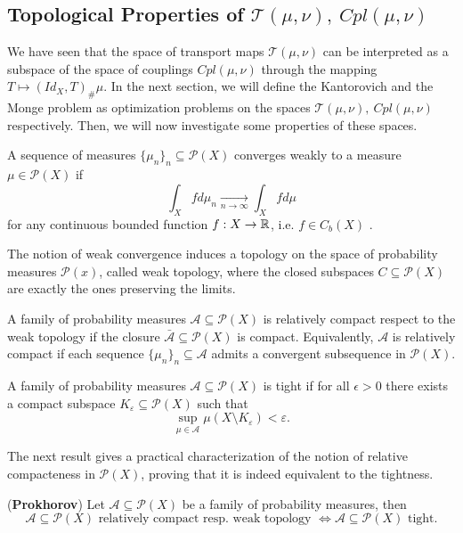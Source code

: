 \documentclass[../main.tex]{subfiles}
\begin{document}
\subsection{Topological Properties of $\mathcal{T}(\mu, \nu), \ Cpl(\mu, \nu)$}
We have seen that the space of transport maps $\mathcal{T}(\mu, \nu)$ can be interpreted as a subspace of the space of couplings $Cpl(\mu, \nu)$ through the mapping $T\mapsto (Id_X, T)_\#\mu$. In the next section, we will define the Kantorovich and the Monge problem as optimization problems on the spaces $\mathcal{T}(\mu, \nu), \ Cpl(\mu, \nu)$ respectively. Then, we will now investigate some properties of these spaces. 

\begin{definition}
    A sequence of measures $\{\mu_n\}_n\subseteq \mathcal{P}(X)$ converges weakly to a measure $\mu\in\mathcal{P}(X)$ if $$\int_X fd\mu_n \underset{n\to\infty}{\longrightarrow} \int_X f d\mu$$ for any continuous bounded function $f:X\to\mathbb{R}$, i.e. $f\in C_b(X)$ .
\end{definition}

The notion of weak convergence induces a topology on the space of probability measures $\mathcal{P}(x)$, called weak topology, where the closed subspaces $C\subseteq\mathcal{P}(X)$ are exactly the ones preserving the limits.

\begin{definition}
    A family of probability measures $\mathcal{A}\subseteq\mathcal{P}(X)$ is relatively compact respect to the weak topology if the closure $\bar{\mathcal{A}}\subseteq\mathcal{P}(X)$ is compact. Equivalently, $\mathcal{A}$ is relatively compact if each sequence $\{\mu_n\}_n\subseteq\mathcal{A}$ admits a convergent subsequence in $\mathcal{P}(X)$.
\end{definition}

\begin{definition}
    A family of probability measures $\mathcal{A}\subseteq\mathcal{P}(X)$ is tight if for all $\epsilon>0$ there exists a compact subspace $K_\varepsilon\subseteq\mathcal{P}(X)$ such that $$\sup_{\mu\in\mathcal{A}} \mu(X\setminus K_\varepsilon)<\varepsilon.$$
\end{definition}

The next result gives a practical characterization of the notion of relative compacteness in $\mathcal{P}(X)$, proving that it is indeed equivalent to the tightness.

\begin{theorem}
\label{thm:prokhorov}
    (\textbf{Prokhorov}) Let $\mathcal{A}\subseteq\mathcal{P}(X)$ be a family of probability measures, then $$\mathcal{A}\subseteq\mathcal{P}(X) \text{ relatively compact resp. weak topology } \iff \mathcal{A}\subseteq\mathcal{P}(X) \text{ tight.}$$
\end{theorem}
\end{document}
